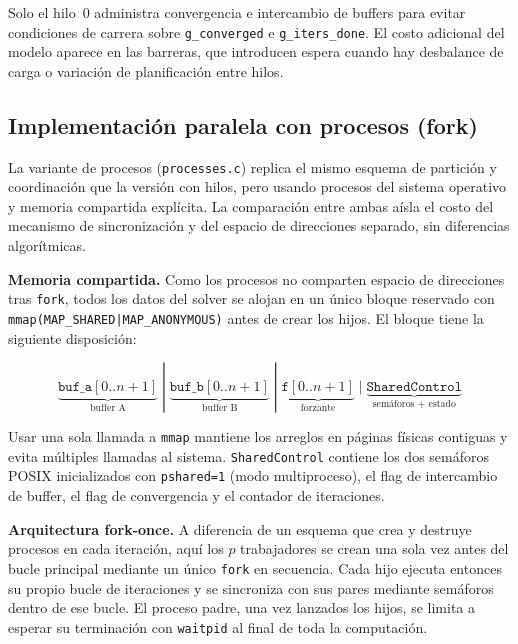 Solo el hilo~0 administra convergencia e intercambio de buffers para evitar condiciones de carrera sobre \texttt{g\_converged} e \texttt{g\_iters\_done}. El costo adicional del modelo aparece en las barreras, que introducen espera cuando hay desbalance de carga o variación de planificación entre hilos.

\subsection{Implementación paralela con procesos (fork)}

La variante de procesos (\texttt{processes.c}) replica el mismo esquema de partición y coordinación que la versión con hilos, pero usando procesos del sistema operativo y memoria compartida explícita. La comparación entre ambas aísla el costo del mecanismo de sincronización y del espacio de direcciones separado, sin diferencias algorítmicas.

\textbf{Memoria compartida.} Como los procesos no comparten espacio de direcciones tras \texttt{fork}, todos los datos del solver se alojan en un único bloque reservado con \texttt{mmap(MAP\_SHARED|MAP\_ANONYMOUS)} antes de crear los hijos. El bloque tiene la siguiente disposición:

\begin{equation*}
    \underbrace{\texttt{buf\_a}[0..n+1]}_{\text{buffer A}} \;|\;
    \underbrace{\texttt{buf\_b}[0..n+1]}_{\text{buffer B}} \;|\;
    \underbrace{\texttt{f}[0..n+1]}_{\text{forzante}} \;|\;
    \underbrace{\texttt{SharedControl}}_{\text{semáforos + estado}}
\end{equation*}

Usar una sola llamada a \texttt{mmap} mantiene los arreglos en páginas físicas contiguas y evita múltiples llamadas al sistema. \texttt{SharedControl} contiene los dos semáforos POSIX inicializados con \texttt{pshared=1} (modo multiproceso), el flag de intercambio de buffer, el flag de convergencia y el contador de iteraciones.

\textbf{Arquitectura fork-once.} A diferencia de un esquema que crea y destruye procesos en cada iteración, aquí los $p$ trabajadores se crean una sola vez antes del bucle principal mediante un único \texttt{fork} en secuencia. Cada hijo ejecuta entonces su propio bucle de iteraciones y se sincroniza con sus pares mediante semáforos dentro de ese bucle. El proceso padre, una vez lanzados los hijos, se limita a esperar su terminación con \texttt{waitpid} al final de toda la computación.

